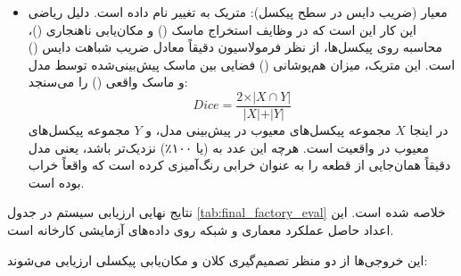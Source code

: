 \documentclass{article}
\begin{document}
\begin{itemize}
	\item معیار  (ضریب دایس در سطح پیکسل): متریک  به  تغییر نام داده است. دلیل ریاضی این کار این است که در وظایف استخراج ماسک () و مکان‌یابی ناهنجاری ()، محاسبه  روی پیکسل‌ها، از نظر فرمولاسیون دقیقاً معادل ضریب شباهت دایس () است. این متریک، میزان هم‌پوشانی () فضایی بین ماسک پیش‌بینی‌شده توسط مدل و ماسک واقعی () را می‌سنجد:
	$$Dice = \frac{2 \times \vert{}X \cap Y\vert{}}{\vert{}X\vert{} + \vert{}Y\vert{}}$$
	در اینجا $X$ مجموعه پیکسل‌های معیوب در پیش‌بینی مدل، و $Y$ مجموعه پیکسل‌های معیوب در واقعیت است. هرچه این عدد به  (یا ۱۰۰٪) نزدیک‌تر باشد، یعنی مدل دقیقاً همان‌جایی از قطعه را به عنوان خرابی رنگ‌آمیزی کرده است که واقعاً خراب بوده است.
\end{itemize}


نتایج نهایی ارزیابی سیستم در جدول \ref{tab:final_factory_eval} خلاصه شده است. این اعداد حاصل عملکرد معماری  و شبکه  روی داده‌های آزمایشی کارخانه است.

\begin{table}[htbp]
	\centering
	\caption{خلاصه نتایج ارزیابی نهایی کارخانه به تفکیک کلاس‌ها ()}
	\label{tab:final_factory_eval}
	\vspace{2mm}
\end{table}

این خروجی‌ها از دو منظر تصمیم‌گیری کلان و مکان‌یابی پیکسلی ارزیابی می‌شوند:
\end{document}
